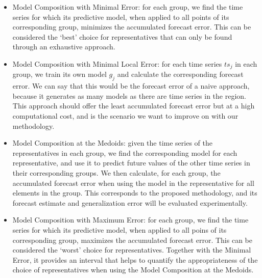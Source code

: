 \begin{itemize}%
	\item Model Composition with Minimal Error: for each group, we find the time series for which its predictive model, when applied to all points of its corresponding group, minimizes the accumulated forecast error. This can be considered the `best' choice for representatives that can only be found through an exhaustive approach.
	\item Model Composition with Minimal Local Error: for each time series $ts_j$ in each group, we train its own model $g_j$ and calculate the corresponding forecast error. We can say that this would be the forecast error of a naive approach, because it generates as many models as there are time series in the region. This approach should offer the least accumulated forecast error but at a high computational cost, and is the scenario we want to improve on with our methodology.
	\item Model Composition at the Medoids: given the time series of the representatives in each group, we find the corresponding model for each representative, and use it to predict future values of the other time series in their corresponding groups. We then calculate, for each group, the accumulated forecast error when using the model in the representative for all elements in the group. This corresponds to the proposed methodology, and its forecast estimate and generalization error will be evaluated experimentally.
	\item Model Composition with Maximum Error: for each group, we find the time series for which its predictive model, when applied to all poins of its corresponding group, maximizes the accumulated forecast error. This can be considered the `worst' choice for representatives. Together with the Minimal Error, it provides an interval that helps to quantify the appropriateness of the choice of representatives when using the Model Composition at the Medoids.
\end{itemize}



